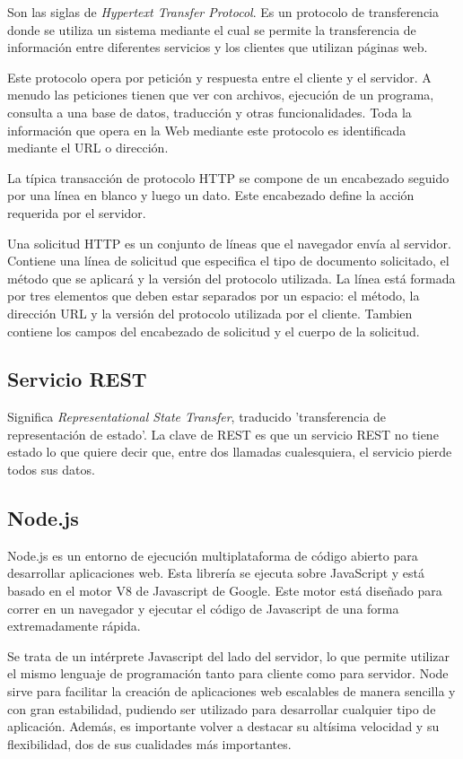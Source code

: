 \documentclass[a4paper, 12pt]{book}
\begin{document}
Son las siglas de \emph{Hypertext Transfer Protocol}\cite{HTTP}. Es un protocolo de transferencia donde se utiliza un sistema mediante el cual se permite la transferencia de informaci\'on entre diferentes servicios y los clientes que utilizan p\'aginas web.

Este protocolo opera por petici\'on y respuesta entre el cliente y el servidor. A menudo las peticiones tienen que ver con archivos, ejecuci\'on de un programa, consulta a una base de datos, traducci\'on y otras funcionalidades. Toda la informaci\'on que opera en la Web mediante este protocolo es identificada mediante el URL o direcci\'on.

La t\'ipica transacci\'on de protocolo HTTP se compone de un encabezado seguido por una l\'inea en blanco y luego un dato. Este encabezado define la acci\'on requerida por el servidor.

Una solicitud HTTP es un conjunto de l\'ineas que el navegador env\'ia al servidor. Contiene una l\'inea de solicitud que especifica el tipo de documento solicitado, el m\'etodo que se aplicar\'a y la versi\'on del protocolo utilizada. La l\'inea est\'a formada por tres elementos que deben estar separados por un espacio: el m\'etodo, la direcci\'on URL y la versi\'on del protocolo utilizada por el cliente. Tambien contiene los campos del encabezado de solicitud y el cuerpo de la solicitud.

\subsection{Servicio REST}
\label{subsec:rest}
Significa \emph{Representational State Transfer}\cite{REST}, traducido 'transferencia de representaci\'on de estado'. La clave de REST es que un servicio REST no tiene estado lo que quiere decir que, entre dos llamadas cualesquiera, el servicio pierde todos sus datos.

\subsection{Node.js}
\label{subsec:estilo}

Node.js\cite{Node} es un entorno de ejecuci\'on multiplataforma de c\'odigo abierto para desarrollar aplicaciones
web. Esta librer\'ia se ejecuta sobre JavaScript y est\'a basado en el motor V8 de Javascript
de Google. Este motor est\'a dise\~nado para correr en un navegador y ejecutar el c\'odigo de 
Javascript de una forma extremadamente r\'apida.

Se trata de un int\'erprete Javascript del lado del servidor, lo que permite utilizar el mismo
lenguaje de programaci\'on tanto para cliente como para servidor.
Node sirve para facilitar la creaci\'on de aplicaciones web escalables de manera sencilla y con
gran estabilidad, pudiendo ser utilizado para desarrollar cualquier tipo de aplicaci\'on. Adem\'as,
es importante volver a destacar su alt\'isima velocidad y su flexibilidad, dos de sus cualidades
m\'as importantes.
\end{document}
